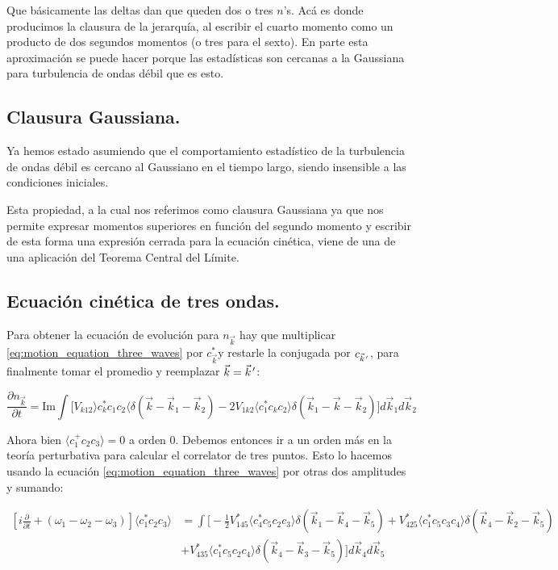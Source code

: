 Que básicamente las deltas dan que queden dos o tres  $n$'s. Acá es donde producimos la clausura de la jerarquía, al escribir el cuarto momento como un producto de dos segundos momentos (o tres para el sexto). En parte esta aproximación se puede hacer porque las estadísticas son cercanas a la Gaussiana para turbulencia de ondas débil que es esto. \cite{falkovichTurbulence2006} 

\subsection*{Clausura Gaussiana.}
Ya hemos estado asumiendo que el comportamiento estadístico de la turbulencia de ondas débil es cercano al Gaussiano en el tiempo largo, siendo insensible a las condiciones iniciales. \cite{falconLaboratoryExperimentsWave2010} 

Esta propiedad, a la cual nos referimos como clausura Gaussiana ya que nos permite expresar momentos superiores en función del segundo momento y escribir de esta forma una expresión cerrada para la ecuación cinética, viene de una de una aplicación del Teorema Central del Límite. \cite{hasselmannNonlinearEnergyTransfer1962} 


\subsection*{Ecuación cinética de tres ondas.}
Para obtener la ecuación de evolución para $n_{\vec k}$ hay que multiplicar \eqref{eq:motion_equation_three_waves} por $c^*_{\vec k}$y restarle la conjugada por $c_{\pvec k'}$, para finalmente tomar el promedio y reemplazar $\vec k=\pvec k'$:

\begin{equation}
	\frac{\partial n_{\vec k}}{\partial t} = \text{Im} \int\big[V_{k12} \rangle c_k^*c_1c_2 \langle \delta(\vec k- \vec k_1 -\vec k_2) - 2V_{1k2}\langle c_1^*c_kc_2 \rangle \delta(\vec k_1 - \vec k - \vec k_2) \big] d\vec k_1 d\vec k_2
\end{equation} 

Ahora bien $\langle c_1^+c_2c_3 \rangle = 0$ a orden 0. Debemos entonces ir a un orden más en la teoría perturbativa para calcular el correlator de tres puntos. Esto lo hacemos usando la ecuación \eqref{eq:motion_equation_three_waves} por otras dos amplitudes y sumando:

\begin{equation}
	\begin{split}
		\left[i\frac{\partial}{\partial t} + (\omega_1-\omega_2-\omega_3)\right] \langle c_1^*c_2c_3 \rangle &= \int \bigg[-\frac{1}{2}V_{145}^*\langle c_4^*c_5c_2c_3 \rangle \delta(\vec k_1 - \vec k_4 -\vec k_5) + V_{425}^*\langle c_1^*c_5c_3c_4 \rangle \delta(\vec k_4 - \vec k_2 -\vec k_5) \\ 
		&+  V_{435}^*\langle c_1^*c_5c_2c_4 \rangle \delta(\vec k_4 - \vec k_3 -\vec k_5)\bigg] d\vec k_4 d\vec k_5
	\end{split}
\end{equation}

